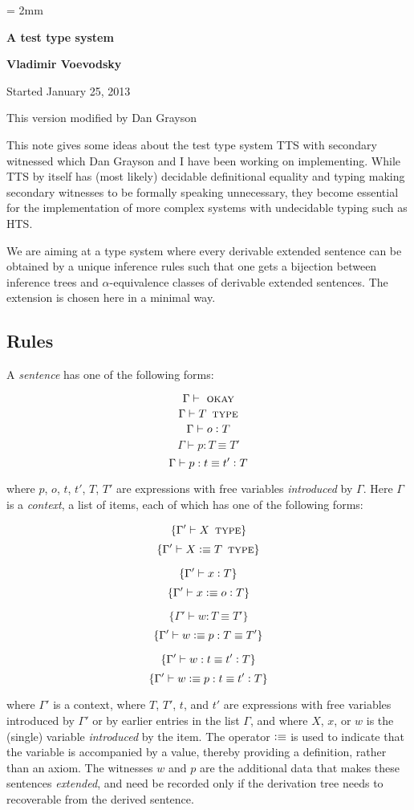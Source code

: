 \documentclass[11pt]{article}
\newcommand{\eqd}{\equiv}
\newcommand{\ccolon}[1]{\vcentcolon#1}
\newcommand{\Type}{\mathop{\text{ \sc type}}}
\newcommand{\Okay}{\mathop{\text{ \sc okay}}}
\newcommand{\defn}{\vcentcolon\equiv}
\begin{document}
\parskip = 2mm
\begin{center}
{\bf\Large A test type system}

{\bf Vladimir Voevodsky}

{Started January 25, 2013}  

{This version modified by Dan Grayson}  
\end{center}

\tableofcontents

This note gives some ideas about the test type system TTS with secondary
witnessed which Dan Grayson and I have been working on implementing. While TTS
by itself has (most likely) decidable definitional equality and typing making
secondary witnesses to be formally speaking unnecessary, they become essential
for the implementation of more complex systems with undecidable typing such as
HTS.

We are aiming at a type system where every derivable extended sentence can be
obtained by a unique inference rules such that one gets a bijection between
inference trees and $\alpha$-equivalence classes of derivable extended
sentences.  The extension is chosen here in a minimal way.

\subsection{Rules}

A {\em sentence} has one of the following forms:

$$\Gamma\vdash \Okay$$
$$\Gamma\vdash T \Type$$
$$\Gamma\vdash o \ccolon{T}$$
$$\Gamma\vdash p : T \eqd T'$$
$$\Gamma\vdash p : t \eqd t' \ccolon{T}$$

where $p$, $o$, $t$, $t'$, $T$, $T'$ are expressions with free variables {\em
  introduced} by $\Gamma$.  Here $\Gamma$ is a {\em context}, a list of items,
each of which has one of the following forms:

$$\{ \Gamma'\vdash X \Type \}$$
$$\{ \Gamma'\vdash X \defn T \Type \}$$

$$\{ \Gamma'\vdash x \ccolon{T} \}$$
$$\{ \Gamma'\vdash x \defn o \ccolon{T} \}$$

$$\{ \Gamma'\vdash w : T \eqd T'\}$$
$$\{ \Gamma'\vdash w \defn p : T \eqd T'\}$$

$$\{ \Gamma'\vdash w : t \eqd t' \ccolon{T} \}$$
$$\{ \Gamma'\vdash w \defn p : t \eqd t' \ccolon{T} \}$$

where $\Gamma'$ is a context, where $T$, $T'$, $t$, and $t'$ are expressions
with free variables introduced by $\Gamma'$ or by earlier entries in the list
$\Gamma$, and where $X$, $x$, or $w$ is the (single) variable {\em introduced}
by the item.  The operator $\defn$ is used to indicate that the variable is
accompanied by a value, thereby providing a definition, rather than an axiom.
The witnesses $w$ and $p$ are the additional data that makes these sentences
{\em extended}, and need be recorded only if the derivation tree needs to
recoverable from the derived sentence.
\end{document}
